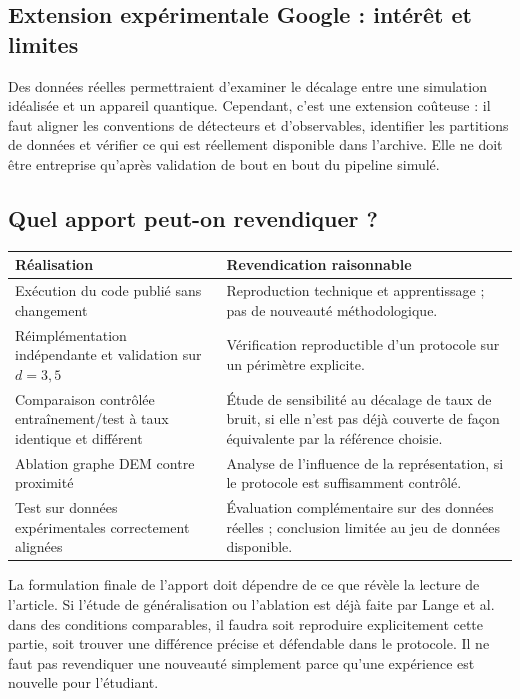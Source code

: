 \documentclass[11pt,a4paper]{article}
\begin{document}
\subsection{Extension expérimentale Google : intérêt et limites}

Des données réelles permettraient d'examiner le décalage entre une simulation
idéalisée et un appareil quantique. Cependant, c'est une extension coûteuse :
il faut aligner les conventions de détecteurs et d'observables, identifier
les partitions de données et vérifier ce qui est réellement disponible dans
l'archive. Elle ne doit être entreprise qu'après validation de bout en bout
du pipeline simulé.

\subsection{Quel apport peut-on revendiquer ?}

\begin{center}
\begin{tabularx}{\textwidth}{p{3.4cm} X}
\toprule
Réalisation & Revendication raisonnable \\
\midrule
Exécution du code publié sans changement & Reproduction technique et apprentissage ; pas de nouveauté méthodologique. \\
Réimplémentation indépendante et validation sur $d=3,5$ & Vérification reproductible d'un protocole sur un périmètre explicite. \\
Comparaison contrôlée entraînement/test à taux identique et différent & Étude de sensibilité au décalage de taux de bruit, si elle n'est pas déjà couverte de façon équivalente par la référence choisie. \\
Ablation graphe DEM contre proximité & Analyse de l'influence de la représentation, si le protocole est suffisamment contrôlé. \\
Test sur données expérimentales correctement alignées & Évaluation complémentaire sur des données réelles ; conclusion limitée au jeu de données disponible. \\
\bottomrule
\end{tabularx}
\end{center}

La formulation finale de l'apport doit dépendre de ce que révèle la lecture
de l'article. Si l'étude de généralisation ou l'ablation est déjà faite par
Lange et al. dans des conditions comparables, il faudra soit reproduire
explicitement cette partie, soit trouver une différence précise et défendable
dans le protocole. Il ne faut pas revendiquer une nouveauté simplement
parce qu'une expérience est nouvelle pour l'étudiant.
\end{document}
